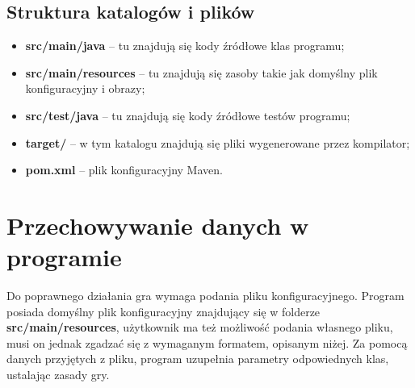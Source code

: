 \documentclass[12pt]{report}
\begin{document}
\subsection{Struktura katalogów i plików}
\begin{itemize}
    \item \textbf{src/main/java} – tu znajdują się kody źródłowe klas programu;
    \item \textbf{src/main/resources} – tu znajdują się zasoby takie jak domyślny plik konfiguracyjny i obrazy;
    \item \textbf{src/test/java} – tu znajdują się kody źródłowe testów programu;
    \item \textbf{target/} – w tym katalogu znajdują się pliki wygenerowane przez kompilator;
    \item \textbf{pom.xml} – plik konfiguracyjny Maven.
\end{itemize}
\section{Przechowywanie danych w programie}
Do poprawnego działania gra wymaga podania pliku konfiguracyjnego. Program posiada domyślny plik konfiguracyjny znajdujący się w folderze \textbf{src/main/resources}, użytkownik ma też możliwość podania własnego pliku, musi on jednak zgadzać się z wymaganym formatem, opisanym niżej. Za pomocą danych przyjętych z pliku, program uzupełnia parametry odpowiednych klas, ustalając zasady gry. 
\end{document}
